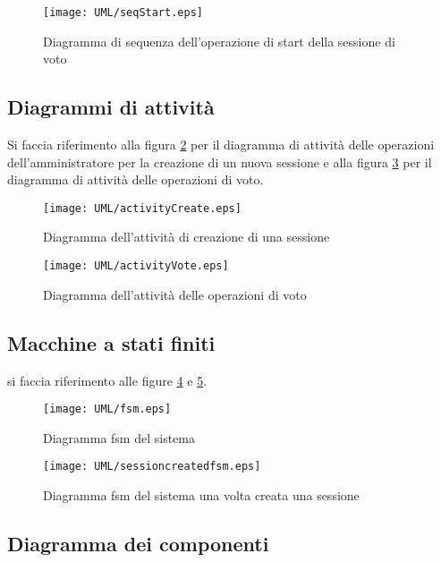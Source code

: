 \begin{figure}[ht]
	\centering
	\texttt{[image: UML/seqStart.eps]}
	\caption{Diagramma di sequenza dell'operazione di start della sessione di voto}
	\label{fig:seqdiagstart}
\end{figure}

\subsection{Diagrammi di attività}
Si faccia riferimento alla figura \ref{fig:activitydiagcreate} per il diagramma di attività delle operazioni dell'amministratore per la creazione di un nuova sessione e alla figura \ref{fig:activitydiagvote} per il diagramma di attività delle operazioni di voto.
\begin{figure}[ht]
	\centering
	\texttt{[image: UML/activityCreate.eps]}
	\caption{Diagramma dell'attività di creazione di una sessione}
	\label{fig:activitydiagcreate}
\end{figure}


\begin{figure}[ht]
	\centering
	\texttt{[image: UML/activityVote.eps]}
	\caption{Diagramma dell'attività delle operazioni di voto}
	\label{fig:activitydiagvote}
\end{figure}

\subsection{Macchine a stati finiti}
si faccia riferimento alle figure \ref{fig:fsm} e \ref{fig:sessionCreatedFsm}.
\begin{figure}[ht]
	\centering
	\texttt{[image: UML/fsm.eps]}
	\caption{Diagramma fsm del sistema}
	\label{fig:fsm}
\end{figure}
\begin{figure}[ht]
	\centering
	\texttt{[image: UML/sessioncreatedfsm.eps]}
	\caption{Diagramma fsm del sistema una volta creata una sessione}
	\label{fig:sessionCreatedFsm}
\end{figure}


\subsection{Diagramma dei componenti}
